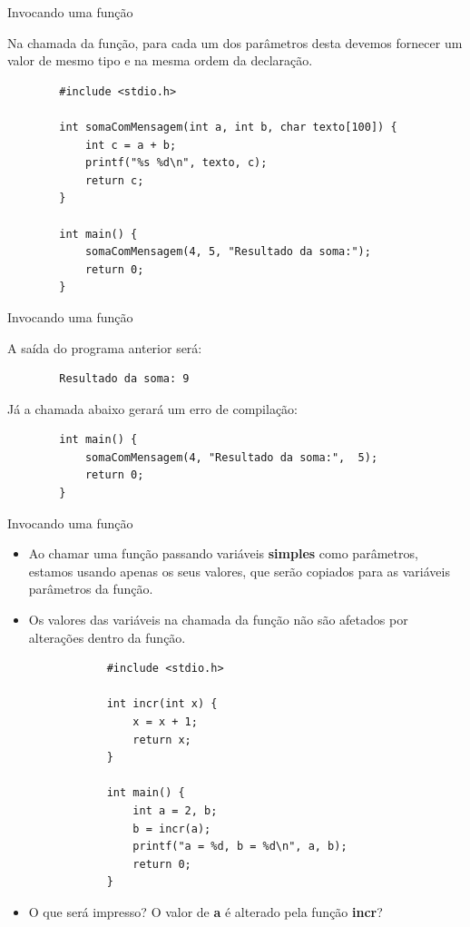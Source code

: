 \documentclass[handout]{beamer}
\begin{document}
\begin{frame}[fragile]{Invocando uma função}

    Na chamada da função, para cada um dos parâmetros desta devemos fornecer um valor de mesmo tipo e na mesma ordem da declaração.
    \begin{verbatim}
        #include <stdio.h>

        int somaComMensagem(int a, int b, char texto[100]) {
            int c = a + b;
            printf("%s %d\n", texto, c);
            return c;
        }

        int main() {
            somaComMensagem(4, 5, "Resultado da soma:");
            return 0;
        }
    \end{verbatim}
\end{frame}

\begin{frame}[fragile]{Invocando uma função}

    A saída do programa anterior será:

    \begin{verbatim}
        Resultado da soma: 9
    \end{verbatim}

    \pause

    Já a chamada abaixo gerará um erro de compilação:
    \begin{verbatim}
        int main() {
            somaComMensagem(4, "Resultado da soma:",  5);
            return 0;
        }
    \end{verbatim}
\end{frame}

\begin{frame}[fragile]{Invocando uma função}

    \small
    \begin{itemize}
        \item Ao chamar uma função passando variáveis {\bf simples} como parâmetros, estamos usando apenas os seus valores, que serão copiados para as variáveis parâmetros da função.
        \item Os valores das variáveis na chamada da função não são afetados por alterações dentro da função.

        \begin{verbatim}
            #include <stdio.h>

            int incr(int x) {
                x = x + 1;
                return x;
            }

            int main() {
                int a = 2, b;
                b = incr(a);
                printf("a = %d, b = %d\n", a, b);
                return 0;
            }
        \end{verbatim}

        \item O que será impresso? O valor de {\bf a} é alterado pela função {\bf incr}?
    \end{itemize}
\end{frame}
\end{document}
